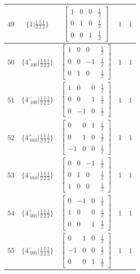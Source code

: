 \documentclass[fleqn,8pt]{jsarticle}
\begin{document}
\begin{longtable}{ccccc}
$ 49 $ & $ \{1|\frac{1}{2} \frac{1}{2} \frac{1}{2}\} $ & $ \begin{bmatrix} 1 & 0 & 0 & \frac{1}{2} \\ 0 & 1 & 0 & \frac{1}{2} \\ 0 & 0 & 1 & \frac{1}{2} \end{bmatrix} $ & $ 1 $ & $ 1 $ \\ \hline
$ 50 $ & $ \{4^{+}_{\,\,100}|\frac{1}{2} \frac{1}{2} \frac{1}{2}\} $ & $ \begin{bmatrix} 1 & 0 & 0 & \frac{1}{2} \\ 0 & 0 & -1 & \frac{1}{2} \\ 0 & 1 & 0 & \frac{1}{2} \end{bmatrix} $ & $ 1 $ & $ 1 $ \\ \hline
$ 51 $ & $ \{4^{-}_{\,\,100}|\frac{1}{2} \frac{1}{2} \frac{1}{2}\} $ & $ \begin{bmatrix} 1 & 0 & 0 & \frac{1}{2} \\ 0 & 0 & 1 & \frac{1}{2} \\ 0 & -1 & 0 & \frac{1}{2} \end{bmatrix} $ & $ 1 $ & $ 1 $ \\ \hline
$ 52 $ & $ \{4^{+}_{\,\,010}|\frac{1}{2} \frac{1}{2} \frac{1}{2}\} $ & $ \begin{bmatrix} 0 & 0 & 1 & \frac{1}{2} \\ 0 & 1 & 0 & \frac{1}{2} \\ -1 & 0 & 0 & \frac{1}{2} \end{bmatrix} $ & $ 1 $ & $ 1 $ \\ \hline
$ 53 $ & $ \{4^{-}_{\,\,010}|\frac{1}{2} \frac{1}{2} \frac{1}{2}\} $ & $ \begin{bmatrix} 0 & 0 & -1 & \frac{1}{2} \\ 0 & 1 & 0 & \frac{1}{2} \\ 1 & 0 & 0 & \frac{1}{2} \end{bmatrix} $ & $ 1 $ & $ 1 $ \\ \hline
$ 54 $ & $ \{4^{+}_{\,\,001}|\frac{1}{2} \frac{1}{2} \frac{1}{2}\} $ & $ \begin{bmatrix} 0 & -1 & 0 & \frac{1}{2} \\ 1 & 0 & 0 & \frac{1}{2} \\ 0 & 0 & 1 & \frac{1}{2} \end{bmatrix} $ & $ 1 $ & $ 1 $ \\ \hline
$ 55 $ & $ \{4^{-}_{\,\,001}|\frac{1}{2} \frac{1}{2} \frac{1}{2}\} $ & $ \begin{bmatrix} 0 & 1 & 0 & \frac{1}{2} \\ -1 & 0 & 0 & \frac{1}{2} \\ 0 & 0 & 1 & \frac{1}{2} \end{bmatrix} $ & $ 1 $ & $ 1 $ \\ \hline

\end{longtable}
\end{document}
